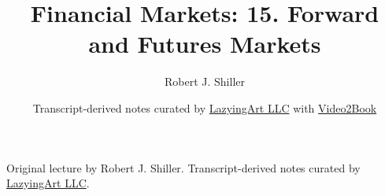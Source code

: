 \documentclass[11pt,oneside]{book}
\begin{document}
\frontmatter
\title{Financial Markets: 15. Forward and Futures Markets}
\author{Robert J. Shiller}
\date{Transcript-derived notes curated by \href{https://lazying.art}{LazyingArt LLC} with \href{https://github.com/lachlanchen/Video2Book}{Video2Book}}
\maketitle
\begin{center}
\small Original lecture by Robert J. Shiller. Transcript-derived notes curated by \href{https://lazying.art}{LazyingArt LLC}.
\end{center}
\clearpage
\mainmatter

\end{document}

